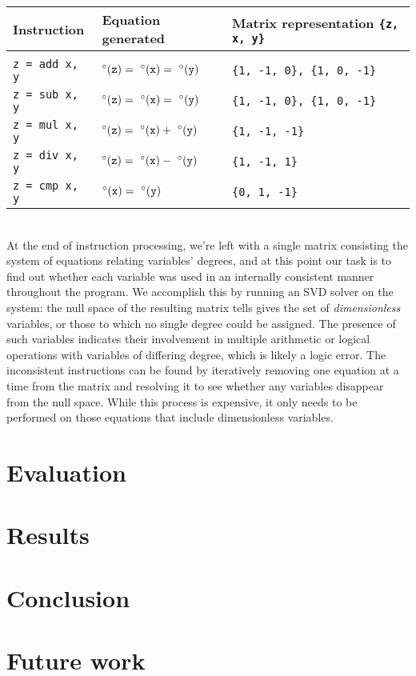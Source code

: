 \documentclass[12pt]{article}
\begin{document}
\begin{tabular}{l l l}
\textbf{Instruction} & \textbf{Equation generated} & \textbf{Matrix representation \texttt{\{z, x, y\}}} \\
\hline \\
\texttt{z = add x, y} & $\degree(\tt{z}) =\ \degree(\tt{x}) =\ \degree(\tt{y})$ & \texttt{\{1, -1, 0\}, \{1, 0, -1\}}\\
\texttt{z = sub x, y} & $\degree(\tt{z}) =\ \degree(\tt{x}) =\ \degree(\tt{y})$ & \texttt{\{1, -1, 0\}, \{1, 0, -1\}}\\
\texttt{z = mul x, y} & $\degree(\tt{z}) =\ \degree(\tt{x}) +\ \degree(\tt{y})$ & \texttt{\{1, -1, -1\}} \\
\texttt{z = div x, y} & $\degree(\tt{z}) =\ \degree(\tt{x}) -\ \degree(\tt{y})$ & \texttt{\{1, -1, 1\}} \\
\texttt{z = cmp x, y} & $\degree(\tt{x}) =\ \degree(\tt{y})$ & \texttt{\{0, 1, -1\}} \\
\end{tabular}
\\

\noindent
At the end of instruction processing, we're left with a single matrix consisting the system of equations relating variables' degrees, and at this point our task is to find out whether each variable was used in an internally consistent manner throughout the program.
We accomplish this by running an SVD solver on the system: the null space of the resulting matrix tells gives the set of \textit{dimensionless} variables, or those to which no single degree could be assigned.
The presence of such variables indicates their involvement in multiple arithmetic or logical operations with variables of differing degree, which is likely a logic error.
The inconsistent instructions can be found by iteratively removing one equation at a time from the matrix and resolving it to see whether any variables disappear from the null space.
While this process is expensive, it only needs to be performed on those equations that include dimensionless variables.

\section{Evaluation}

\section{Results}

\section{Conclusion}

\section{Future work}



\end{document}
